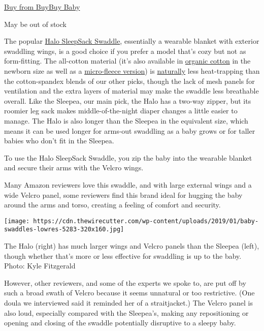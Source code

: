\href{https://shop-links.co/1706409802203647217}{Buy from BuyBuy Baby}

May be out of stock

The popular
\href{https://www.nytimes3xbfgragh.onion/wirecutter/out/link/30687/162166/4/86636/?merchant=BuyBuy\%20Baby}{Halo
SleepSack Swaddle}, essentially a wearable blanket with exterior
swaddling wings, is a good choice if you prefer a model that's cozy but
not as form-fitting. The all-cotton material (it's also available in
\href{https://www.nytimes3xbfgragh.onion/wirecutter/out/link/30781/151090/4/86907/?merchant=Walmart}{organic
cotton} in the newborn size as well as a
\href{https://www.nytimes3xbfgragh.onion/wirecutter/out/link/30696/150987/4/86646/?merchant=Amazon}{micro-fleece
version}) is
\href{https://www.sewingpartsonline.com/blog/411-cotton-vs-polyester-pros-cons/}{naturally}
less heat-trapping than the cotton-spandex blends of our other picks,
though the lack of mesh panels for ventilation and the extra layers of
material may make the swaddle less breathable overall. Like the Sleepea,
our main pick, the Halo has a two-way zipper, but its roomier leg sack
makes middle-of-the-night diaper changes a little easier to manage. The
Halo is also longer than the Sleepea in the equivalent size, which means
it can be used longer for arms-out swaddling as a baby grows or for
taller babies who don't fit in the Sleepea.

To use the Halo SleepSack Swaddle, you zip the baby into the wearable
blanket and secure their arms with the Velcro wings.

Many Amazon reviewers love this swaddle, and with large external wings
and a wide Velcro panel, some reviewers find this brand ideal for
hugging the baby around the arms and torso, creating a feeling of
comfort and security.

\texttt{[image: https://cdn.thewirecutter.com/wp-content/uploads/2019/01/baby-swaddles-lowres-5283-320x160.jpg]}

The Halo (right) has much larger wings and Velcro panels than the
Sleepea (left), though whether that's more or less effective for
swaddling is up to the baby. Photo: Kyle Fitzgerald

However, other reviewers, and some of the experts we spoke to, are put
off by such a broad swath of Velcro because it seems unnatural or too
restrictive. (One doula we interviewed said it reminded her of a
straitjacket.) The Velcro panel is also loud, especially compared with
the Sleepea's, making any repositioning or opening and closing of the
swaddle potentially disruptive to a sleepy baby.

